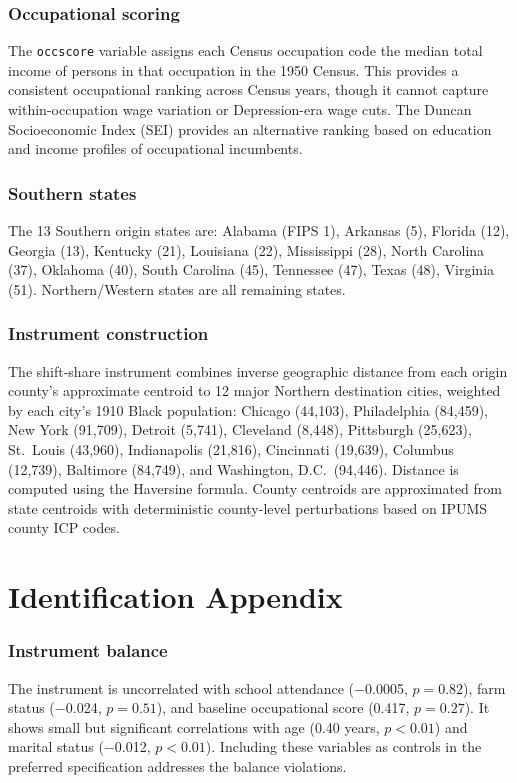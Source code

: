 \documentclass[12pt]{article}
\begin{document}
\subsubsection*{Occupational scoring} The \texttt{occscore} variable assigns each Census occupation code the median total income of persons in that occupation in the 1950 Census. This provides a consistent occupational ranking across Census years, though it cannot capture within-occupation wage variation or Depression-era wage cuts. The Duncan Socioeconomic Index (SEI) provides an alternative ranking based on education and income profiles of occupational incumbents.

\subsubsection*{Southern states} The 13 Southern origin states are: Alabama (FIPS 1), Arkansas (5), Florida (12), Georgia (13), Kentucky (21), Louisiana (22), Mississippi (28), North Carolina (37), Oklahoma (40), South Carolina (45), Tennessee (47), Texas (48), Virginia (51). Northern/Western states are all remaining states.

\subsubsection*{Instrument construction} The shift-share instrument combines inverse geographic distance from each origin county's approximate centroid to 12 major Northern destination cities, weighted by each city's 1910 Black population: Chicago (44,103), Philadelphia (84,459), New York (91,709), Detroit (5,741), Cleveland (8,448), Pittsburgh (25,623), St.\ Louis (43,960), Indianapolis (21,816), Cincinnati (19,639), Columbus (12,739), Baltimore (84,749), and Washington, D.C.\ (94,446). Distance is computed using the Haversine formula. County centroids are approximated from state centroids with deterministic county-level perturbations based on IPUMS county ICP codes.

\section{Identification Appendix}

\subsubsection*{Instrument balance} The instrument is uncorrelated with school attendance ($-$0.0005, $p = 0.82$), farm status ($-$0.024, $p = 0.51$), and baseline occupational score (0.417, $p = 0.27$). It shows small but significant correlations with age (0.40 years, $p < 0.01$) and marital status ($-$0.012, $p < 0.01$). Including these variables as controls in the preferred specification addresses the balance violations.
\end{document}
